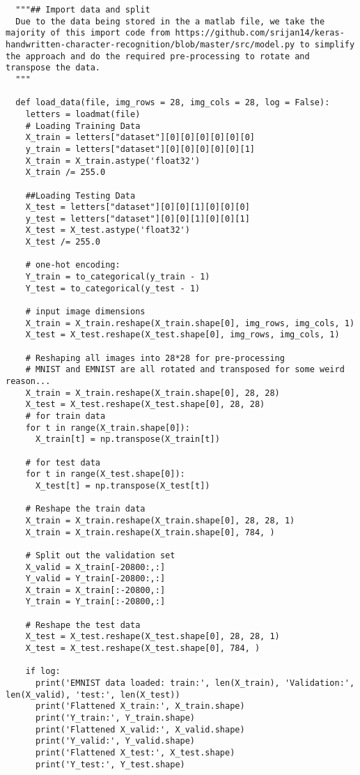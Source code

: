 \documentclass[12pt]{article}
\numberwithin{equation}{section}
\numberwithin{figure}{section}
\numberwithin{table}{section}
\begin{document}
\begin{lstlisting}
  """## Import data and split
  Due to the data being stored in the a matlab file, we take the majority of this import code from https://github.com/srijan14/keras-handwritten-character-recognition/blob/master/src/model.py to simplify the approach and do the required pre-processing to rotate and transpose the data.
  """
  
  def load_data(file, img_rows = 28, img_cols = 28, log = False):
    letters = loadmat(file)
    # Loading Training Data
    X_train = letters["dataset"][0][0][0][0][0][0]
    y_train = letters["dataset"][0][0][0][0][0][1]
    X_train = X_train.astype('float32')
    X_train /= 255.0
  
    ##Loading Testing Data
    X_test = letters["dataset"][0][0][1][0][0][0]
    y_test = letters["dataset"][0][0][1][0][0][1]
    X_test = X_test.astype('float32')
    X_test /= 255.0
  
    # one-hot encoding:
    Y_train = to_categorical(y_train - 1)
    Y_test = to_categorical(y_test - 1)
  
    # input image dimensions
    X_train = X_train.reshape(X_train.shape[0], img_rows, img_cols, 1)
    X_test = X_test.reshape(X_test.shape[0], img_rows, img_cols, 1)
  
    # Reshaping all images into 28*28 for pre-processing
    # MNIST and EMNIST are all rotated and transposed for some weird reason...
    X_train = X_train.reshape(X_train.shape[0], 28, 28)
    X_test = X_test.reshape(X_test.shape[0], 28, 28)
    # for train data
    for t in range(X_train.shape[0]):
      X_train[t] = np.transpose(X_train[t])
  
    # for test data
    for t in range(X_test.shape[0]):
      X_test[t] = np.transpose(X_test[t])
  
    # Reshape the train data
    X_train = X_train.reshape(X_train.shape[0], 28, 28, 1)
    X_train = X_train.reshape(X_train.shape[0], 784, )
  
    # Split out the validation set
    X_valid = X_train[-20800:,:]
    Y_valid = Y_train[-20800:,:]
    X_train = X_train[:-20800,:]
    Y_train = Y_train[:-20800,:]
  
    # Reshape the test data
    X_test = X_test.reshape(X_test.shape[0], 28, 28, 1)
    X_test = X_test.reshape(X_test.shape[0], 784, )
    
    if log:
      print('EMNIST data loaded: train:', len(X_train), 'Validation:', len(X_valid), 'test:', len(X_test))
      print('Flattened X_train:', X_train.shape)
      print('Y_train:', Y_train.shape)
      print('Flattened X_valid:', X_valid.shape)
      print('Y_valid:', Y_valid.shape)
      print('Flattened X_test:', X_test.shape)
      print('Y_test:', Y_test.shape)
  

\end{lstlisting}
\end{document}
